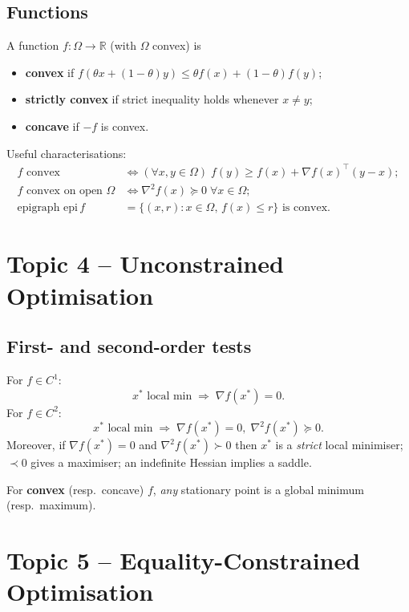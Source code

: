 \documentclass[12pt]{article}
\begin{document}
\subsection{Functions}
A function \(f:\Omega\to\mathbb R\) (with \(\Omega\) convex) is
\begin{itemize}
  \item {\bf convex} if
        \(f(\theta x+(1-\theta)y)\le\theta f(x)+(1-\theta)f(y)\);
  \item {\bf strictly convex} if strict inequality holds whenever \(x\ne y\);
  \item {\bf concave} if \(-f\) is convex.
\end{itemize}

Useful characterisations:
\begin{align*}
f \text{ convex } &\iff
(\forall x,y\in\Omega)\;
f(y)\ge f(x)+\nabla f(x)^\top(y-x); \\
f \text{ convex on open }\Omega
 &\iff \nabla^2f(x)\succeq0\;\forall x\in\Omega;\\
\text{epigraph } \mathrm{epi}\,f
 &=\{(x,r): x\in\Omega,\,f(x)\le r\}\text{ is convex.}
\end{align*}

\bigskip

\section{Topic 4 – Unconstrained Optimisation}

\subsection{First- and second-order tests}
For \(f\in C^1\):
\[
x^\ast\text{ local min}\;\Longrightarrow\; \nabla f(x^\ast)=0.
\]
For \(f\in C^2\):
\[
x^\ast\text{ local min}\;\Longrightarrow\;
\nabla f(x^\ast)=0,\;
\nabla^2 f(x^\ast)\succeq0.
\]
Moreover, if \(\nabla f(x^\ast)=0\) and \(\nabla^2 f(x^\ast)\succ0\) then
\(x^\ast\) is a {\it strict} local minimiser; \(\prec0\) gives a maximiser; an
indefinite Hessian implies a saddle.

For {\bf convex} (resp.\ concave) \(f\), {\em any} stationary point is a global
minimum (resp.\ maximum).

\section{Topic 5 – Equality-Constrained Optimisation}
\end{document}
